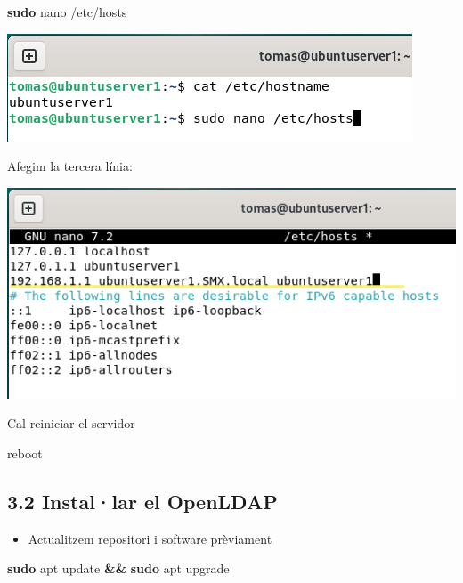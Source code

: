 \documentclass[
  12 pt,
  a4paper,
]{article}
\newenvironment{Shaded}{\begin{snugshade}}{\end{snugshade}}
\newcommand{\ExtensionTok}[1]{#1}
\newcommand{\FunctionTok}[1]{\textcolor[rgb]{0.13,0.29,0.53}{\textbf{#1}}}
\newcommand{\KeywordTok}[1]{\textcolor[rgb]{0.13,0.29,0.53}{\textbf{#1}}}
\newcommand{\NormalTok}[1]{#1}
\providecommand{\tightlist}{%
  \setlength{\itemsep}{0pt}\setlength{\parskip}{0pt}}
\begin{document}
\begin{Shaded}
\begin{Highlighting}[]
\FunctionTok{sudo}\NormalTok{ nano /etc/hosts}
\end{Highlighting}
\end{Shaded}

\includegraphics{png/hosts.png}

Afegim la tercera línia:

\includegraphics{png/hosts1.png}

Cal reiniciar el servidor

\begin{Shaded}
\begin{Highlighting}[]
\ExtensionTok{reboot}
\end{Highlighting}
\end{Shaded}

\subsection{3.2 Instal·lar el OpenLDAP}\label{installar-el-openldap}

\begin{itemize}
\tightlist
\item
  Actualitzem repositori i software prèviament
\end{itemize}

\begin{Shaded}
\begin{Highlighting}[]
\FunctionTok{sudo}\NormalTok{ apt update }\KeywordTok{\&\&} \FunctionTok{sudo}\NormalTok{ apt upgrade}
\end{Highlighting}
\end{Shaded}
\end{document}
